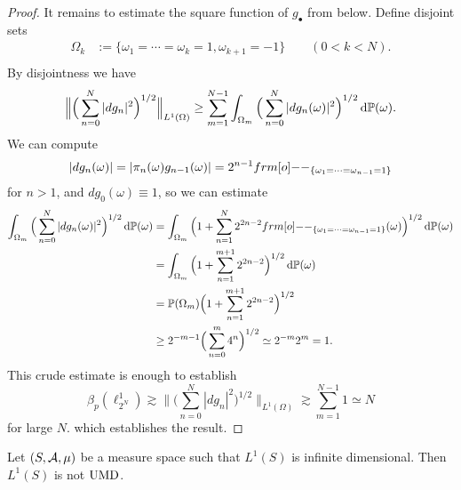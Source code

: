 \begin{proof}
  It remains to estimate the square function of $g_{\bullet}$ from below.
  Define disjoint sets
  \begin{equation*}
    \begin{aligned}
      \Omega_{k} &:= \{\omega_{1} = \cdots = \omega_{k} = 1, \omega_{k+1} = -1\} \qquad (0 < k < N). \\
    \end{aligned}
  \end{equation*}
  By disjointness we have
  \begin{equation*}
    \Big\| \Big( \sum_{n=0}^{N} |dg_{n}|^2 \Big)^{1/2} \Big\|_{L^1(\Omega)}
    \geq \sum_{m = 1}^{N - 1} \int_{\Omega_{m}} \Big( \sum_{n=0}^{N} |dg_{n}(\omega)|^2 \Big)^{1/2} \, \mathrm{d}\mathbb{P}(\omega).
  \end{equation*}
  We can compute
  \begin{equation*}
    |dg_{n}(\omega)| = |\pi_{n}(\omega) g_{n-1}(\omega)| = 2^{n-1} \1_{\{\omega_{1} = \cdots = \omega_{n-1} = 1\}}
  \end{equation*}
  for $n > 1$, and $dg_{0}(\omega) \equiv 1$, so we can estimate
  \begin{equation*}
    \begin{aligned}
    \int_{\Omega_{m}} \Big( \sum_{n=0}^{N} |dg_{n}(\omega)|^2 \Big)^{1/2} \, \dd\P(\omega) 
    &= \int_{\Omega_{m}} \Big( 1 + \sum_{n=1}^{N} 2^{2n - 2} \1_{\{ \omega_{1} = \cdots = \omega_{n-1} = 1\}}(\omega) \Big)^{1/2} \, \dd\P(\omega) \\
    &= \int_{\Omega_{m}} \Big( 1 + \sum_{n=1}^{m+1} 2^{2n - 2} \Big)^{1/2} \, \dd\P(\omega) \\
    &= \P(\Omega_{m})\Big( 1 + \sum_{n=1}^{m+1} 2^{2n - 2} \Big)^{1/2} \\
    &\geq 2^{-m-1}\Big(\sum_{n=0}^{m} 4^n\Big)^{1/2} 
    \simeq 2^{-m} 2^{m} = 1.
  \end{aligned}
\end{equation*}
This crude estimate is enough to establish
\begin{equation*}
  \beta_{p}(\ell^1_{2^N}) \gtrsim \Big\| \Big( \sum_{n=0}^{N} |dg_{n}|^2 \Big)^{1/2} \Big\|_{L^1(\Omega)}
  \gtrsim \sum_{m=1}^{N-1} 1 \simeq N
\end{equation*}
for large $N$. which establishes the result.
  
  
\end{proof}

\begin{cor}
  Let $(S,\mathcal{A},\mu)$ be a measure space such that $L^1(S)$ is infinite dimensional.
  Then $L^1(S)$ is not $\mathrm{UMD}$.
\end{cor}

